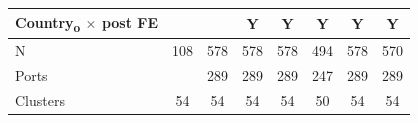 {\begin{tabular}{l*{7}{c}}
Country\textsubscript{o} $\times$ post FE&               &               &           Y   &           Y   &           Y   &           Y   &           Y   \\
\midrule
N           &         108   &         578   &         578   &         578   &         494   &         578   &         570   \\
Ports       &               &         289   &         289   &         289   &         247   &         289   &         289   \\
Clusters    &          54   &          54   &          54   &          54   &          50   &          54   &          54   \\
\bottomrule
\end{tabular}
}
